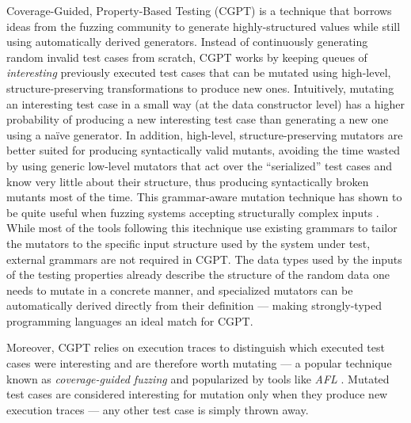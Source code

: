 \documentclass[sigconf, anonymous, review]{acmart}
\newcommand{\quickcheck}{\textit{QuickCheck}\xspace}
\newcommand{\quickchick}{\textit{QuickChick}\xspace}
\newcommand{\fuzzchick}{\textit{FuzzChick}\xspace}
\begin{document}
%
Coverage-Guided, Property-Based Testing (CGPT) \cite{lampropoulos2019coverage}
is a technique that borrows ideas from the fuzzing community to generate
highly-structured values while still using automatically derived generators.
%
%
Instead of continuously generating random invalid test cases from scratch, CGPT
works by keeping queues of \emph{interesting} previously executed test cases
that can be mutated using high-level, structure-preserving transformations to
produce new ones.
%
%
Intuitively, mutating an interesting test case in a small way (at the data
constructor level) has a higher probability of producing a new interesting test
case than generating a new one using a na\"ive generator.
%
In addition, high-level, structure-preserving mutators are better suited for
producing syntactically valid mutants, avoiding the time wasted by using generic
low-level mutators that act over the ``serialized'' test cases and know very
little about their structure, thus producing syntactically broken mutants most
of the time.
%
This grammar-aware mutation technique has shown to be quite useful when fuzzing
systems accepting structurally complex inputs \cite{holler2012fuzzing,
  wang2019superion, xsmith}.
%
While most of the tools following this itechnique use existing grammars to
tailor the mutators to the specific input structure used by the system under
test, external grammars are not required in CGPT.
%
%
%
The data types used by the inputs of the testing properties already describe the
structure of the random data one needs to mutate in a concrete manner, and
specialized mutators can be automatically derived directly from their definition
--- making strongly-typed programming languages an ideal match for CGPT.

%
Moreover, CGPT relies on execution traces to distinguish which executed test
cases were interesting and are therefore worth mutating --- a popular technique
known as \emph{coverage-guided fuzzing} and popularized by tools like \emph{AFL}
\cite{afl}.
%
Mutated test cases are considered interesting for mutation only when they
produce new execution traces --- any other test case is simply thrown away.
\end{document}
